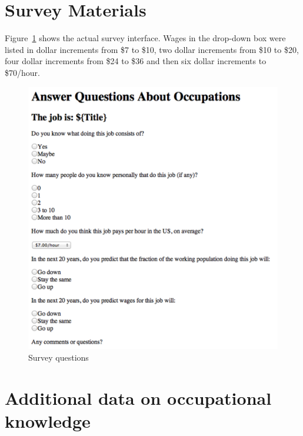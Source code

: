 \documentclass[12pt]{article}
\begin{document}
\appendix 

\section{Survey Materials} \label{sec:survey}  
Figure~\ref{fig:survey} shows the actual survey interface.  
Wages in the drop-down box were listed in dollar increments from \$7 to \$10, two dollar increments from \$10 to \$20, four dollar increments from \$24 to \$36 and then six dollar increments to \$70/hour.  

\begin{figure}
\centering
\caption{Survey questions \label{fig:survey}}
\begin{minipage}{0.75 \linewidth}
\includegraphics[width = \linewidth]{./images/survey.png}
\end{minipage}  
\end{figure} 

\section{Additional data on occupational knowledge} \label{sec:additional}
\end{document}
